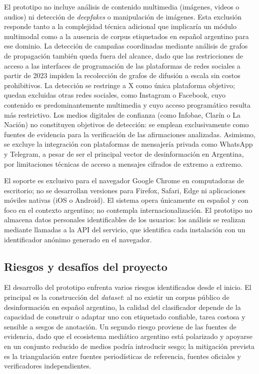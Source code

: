El prototipo no incluye análisis de contenido multimedia (imágenes, videos o audios) ni detección de \textit{deepfakes} o manipulación de imágenes. Esta exclusión responde tanto a la complejidad técnica adicional que implicaría un módulo multimodal como a la ausencia de corpus etiquetados en español argentino para ese dominio. La detección de campañas coordinadas mediante análisis de grafos de propagación también queda fuera del alcance, dado que las restricciones de acceso a las interfaces de programación de las plataformas de redes sociales a partir de 2023 impiden la recolección de grafos de difusión a escala sin costos prohibitivos. La detección se restringe a X como única plataforma objetivo; quedan excluidas otras redes sociales, como Instagram o Facebook, cuyo contenido es predominantemente multimedia y cuyo acceso programático resulta más restrictivo. Los medios digitales de confianza (como Infobae, Clarín o La Nación) no constituyen objetivos de detección: se emplean exclusivamente como fuentes de evidencia para la verificación de las afirmaciones analizadas. Asimismo, se excluye la integración con plataformas de mensajería privada como WhatsApp y Telegram, a pesar de ser el principal vector de desinformación en Argentina, por limitaciones técnicas de acceso a mensajes cifrados de extremo a extremo.

El soporte es exclusivo para el navegador Google Chrome en computadoras de escritorio; no se desarrollan versiones para Firefox, Safari, Edge ni aplicaciones móviles nativas (iOS o Android). El sistema opera únicamente en español y con foco en el contexto argentino; no contempla internacionalización. El prototipo no almacena datos personales identificables de los usuarios: los análisis se realizan mediante llamadas a la API del servicio, que identifica cada instalación con un identificador anónimo generado en el navegador.

\subsection{Riesgos y desafíos del proyecto}

El desarrollo del prototipo enfrenta varios riesgos identificados desde el inicio. El principal es la construcción del \textit{dataset}: al no existir un corpus público de desinformación en español argentino, la calidad del clasificador depende de la capacidad de construir o adaptar uno con etiquetado confiable, tarea costosa y sensible a sesgos de anotación. Un segundo riesgo proviene de las fuentes de evidencia, dado que el ecosistema mediático argentino está polarizado y apoyarse en un conjunto reducido de medios podría introducir sesgo; la mitigación prevista es la triangulación entre fuentes periodísticas de referencia, fuentes oficiales y verificadores independientes.

